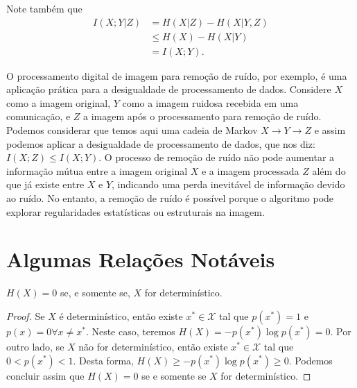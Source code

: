 Note também que
\begin{subequations}
  \begin{align}
    I(X; Y|Z) &= H(X|Z) - H(X|Y,Z) \\
              &\leq H(X) - H(X|Y) \\
              &= I(X;Y) .
  \end{align}
\end{subequations}

O processamento digital de imagem para remoção de ruído, por exemplo, é uma
aplicação prática para a desigualdade de processamento de dados. Considere $X$
como a imagem original, $Y$ como a imagem ruidosa recebida em uma comunicação,
e $Z$  a imagem após o processamento para remoção de ruído. Podemos considerar
que temos aqui uma cadeia de Markov $X \rightarrow Y \rightarrow Z$ e assim
podemos aplicar a desigualdade de processamento de dados, que nos diz:
$I(X;Z) \leq I(X;Y)$. O processo de remoção de ruído não pode aumentar a informação
mútua entre a imagem original $X$ e a imagem processada $Z$ além do que já
existe entre $X$ e $Y$, indicando uma perda inevitável de informação devido ao
ruído. No entanto, a remoção de ruído é possível porque o algoritmo pode
explorar regularidades estatísticas ou estruturais na imagem.




\section{Algumas Relações Notáveis}

\begin{proposition}\label{prop:detincertnull}
$H(X)=0$ se, e somente se, $X$ for determinístico.
\end{proposition}
\begin{proof}
Se $X$ é determinístico, então existe $x^\ast \in \mathcal{X}$ tal que $p(x^\ast) = 1$ e
$p(x) = 0 \forall x \neq x^\ast$. Neste caso, teremos $H(X) = -p(x^\ast) \log p(x^\ast) = 0$.
Por outro lado, se $X$ não for determinístico, então existe $x^\ast \in \mathcal{X}$ tal que $0 < p(x^\ast) < 1$.
Desta forma, $H(X) \geq -p(x^\ast) \log p(x^\ast) \geq 0$. Podemos concluir assim que
$H(X) = 0$ se e somente se $X$ for determinístico.
\end{proof}


